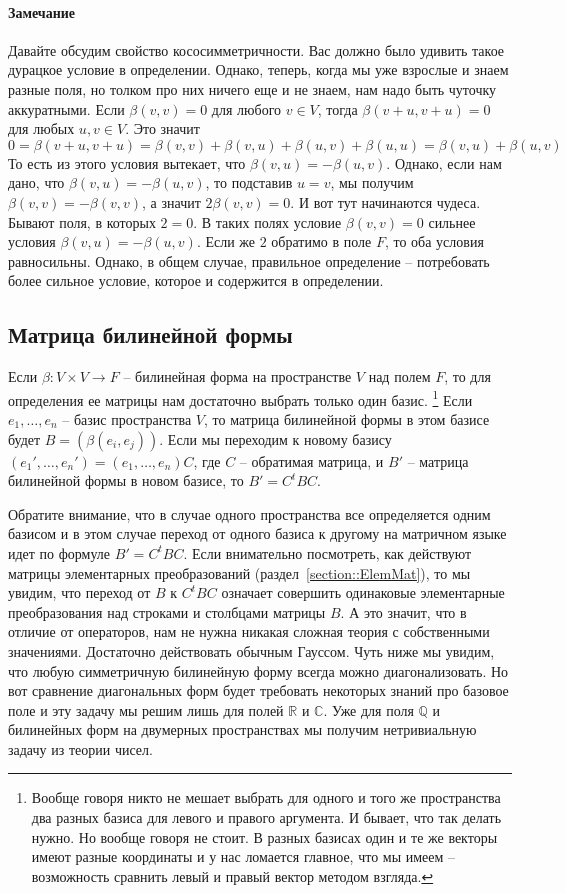 \paragraph{Замечание}

Давайте обсудим свойство кососимметричности.
Вас должно было удивить такое дурацкое условие в определении.
Однако, теперь, когда мы уже взрослые и знаем разные поля, но толком про них ничего еще и не знаем, нам надо быть чуточку аккуратными.
Если $\beta(v,v) = 0$ для любого $v\in V$, тогда $\beta(v+u,v+u) = 0$ для любых $u,v\in V$.
Это значит
\[
0=\beta(v+u,v+u) = \beta(v,v) + \beta(v,u) + \beta(u,v)+\beta(u,u) = \beta(v,u) + \beta(u,v)
\]
То есть из этого условия вытекает, что $\beta(v,u) = -\beta(u,v)$.
Однако, если нам дано, что $\beta(v,u) = -\beta(u,v)$, то подставив $u = v$, мы получим $\beta(v,v) = -\beta(v,v)$, а значит $2\beta(v,v) = 0$.
И вот тут начинаются чудеса.
Бывают поля, в которых $2 = 0$.
В таких полях условие $\beta(v,v) = 0$ сильнее условия $\beta(v,u) = -\beta(u,v)$.
Если же $2$ обратимо в поле $F$, то оба условия равносильны.
Однако, в общем случае, правильное определение -- потребовать более сильное условие, которое и содержится в определении.


\subsection{Матрица билинейной формы}

Если $\beta\colon V\times V\to F$ -- билинейная форма на пространстве $V$ над полем $F$, то для определения ее матрицы нам достаточно выбрать только один базис.%
\footnote{Вообще говоря никто не мешает выбрать для одного и того же пространства два разных базиса для левого и правого аргумента.
И бывает, что так делать нужно.
Но вообще говоря не стоит.
В разных базисах один и те же векторы имеют разные координаты и у нас ломается главное, что мы имеем -- возможность сравнить левый и правый вектор методом взгляда.}
Если $e_1,\ldots,e_n$ -- базис пространства $V$, то матрица билинейной формы в этом базисе будет $B = (\beta(e_i, e_j))$.
Если мы переходим к новому базису $(e_1',\ldots,e_n') = (e_1,\ldots,e_n) C$, где $C$ -- обратимая матрица, и $B'$ -- матрица билинейной формы в новом базисе, то $B' = C^t B C$.

Обратите внимание, что в случае одного пространства все определяется одним базисом и в этом случае переход от одного базиса к другому на матричном языке идет по формуле $B' = C^t B C$.
Если внимательно посмотреть, как действуют матрицы элементарных преобразований (раздел~\ref{section::ElemMat}), то мы увидим, что переход от $B$ к $C^tBC$ означает совершить одинаковые элементарные преобразования над строками и столбцами матрицы $B$.
А это значит, что в отличие от операторов, нам не нужна никакая сложная теория с собственными значениями.
Достаточно действовать обычным Гауссом.
Чуть ниже мы увидим, что любую симметричную билинейную форму всегда можно диагонализовать.
Но вот сравнение диагональных форм будет требовать некоторых знаний про базовое поле и эту задачу мы решим лишь для полей $\mathbb R$ и $\mathbb C$.
Уже для поля $\mathbb Q$ и билинейных форм на двумерных пространствах мы получим нетривиальную задачу из теории чисел.

